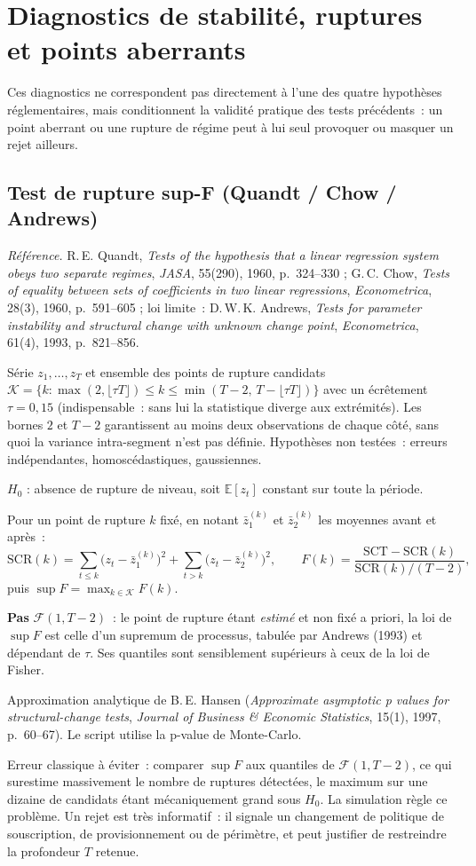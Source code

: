 \documentclass[a4paper,11pt]{article}
\newcommand{\refl}[1]{{\small\textcolor{maincolor!70!black}{\textit{Référence.} #1}}\par\smallskip}
\newcounter{ficheid}
\newenvironment{fiche}[1]{%
  \stepcounter{ficheid}%
  \phantomsection
  \subsection{#1}%
  \label{fiche:\theficheid}%
}{%
  \end{description}\vspace{0.5em}%
}
\newcommand{\Cadre}{%
  \begin{description}[leftmargin=0pt, style=unboxed, itemsep=3pt, topsep=3pt, parsep=2pt]%
  \item[\textcolor{financeblue}{\textbf{1. Cadre, notations et hypothèses de validité (non testées).}}]}
\newcommand{\Hzero}{\item[\textcolor{financeblue}{\textbf{2. Hypothèse nulle.}}]}
\newcommand{\Stat}{\item[\textcolor{financeblue}{\textbf{3. Statistique de test.}}]}
\newcommand{\Loi}{\item[\textcolor{financeblue}{\textbf{4. Loi sous $H_0$.}}]}
\newcommand{\Pval}{\item[\textcolor{financeblue}{\textbf{5. p-value.}}]}
\newcommand{\Usage}{\item[\textcolor{financeblue}{\textbf{6. Usage et limites.}}]}
\begin{document}
\newpage
\clearpage
\section{Diagnostics de stabilité, ruptures et points aberrants}

Ces diagnostics ne correspondent pas directement à l'une des quatre hypothèses réglementaires,
mais conditionnent la validité pratique des tests précédents~: un point aberrant ou une rupture de
régime peut à lui seul provoquer ou masquer un rejet ailleurs.

\begin{fiche}{Test de rupture sup-F (Quandt / Chow / Andrews)}
\refl{R.\,E. Quandt, \emph{Tests of the hypothesis that a linear regression system obeys two
separate regimes}, \emph{JASA}, 55(290), 1960, p.~324--330 ; G.\,C. Chow, \emph{Tests of equality
between sets of coefficients in two linear regressions}, \emph{Econometrica}, 28(3), 1960,
p.~591--605 ; loi limite~: D.\,W.\,K. Andrews, \emph{Tests for parameter instability and
structural change with unknown change point}, \emph{Econometrica}, 61(4), 1993, p.~821--856.}
\Cadre
Série $z_1,\dots,z_T$ et ensemble des points de rupture candidats
$\mathcal{K} = \{k : \max(2, \lfloor \tau T\rfloor) \le k \le \min(T-2,\, T - \lfloor \tau T\rfloor)\}$
avec un écrêtement $\tau = 0{,}15$ (indispensable~: sans lui la statistique diverge aux
extrémités). Les bornes $2$ et $T-2$ garantissent au moins deux observations de chaque côté,
sans quoi la variance intra-segment n'est pas définie.
Hypothèses non testées~: erreurs indépendantes, homoscédastiques, gaussiennes.
\Hzero
$H_0$ : absence de rupture de niveau, soit $\mathbb{E}[z_t]$ constant sur toute la période.
\Stat
Pour un point de rupture $k$ fixé, en notant $\bar z_1^{(k)}$ et $\bar z_2^{(k)}$ les moyennes
avant et après~:
\[
  \mathrm{SCR}(k) = \sum_{t\le k}\big(z_t - \bar z_1^{(k)}\big)^2 + \sum_{t> k}\big(z_t - \bar z_2^{(k)}\big)^2,
  \qquad
  F(k) = \frac{\mathrm{SCT} - \mathrm{SCR}(k)}{\mathrm{SCR}(k)/(T-2)},
\]
puis $\displaystyle \sup F = \max_{k\in\mathcal{K}} F(k)$.
\Loi
\textbf{Pas} $\mathcal{F}(1,T-2)$~: le point de rupture étant \emph{estimé} et non fixé a priori,
la loi de $\sup F$ est celle d'un supremum de processus, tabulée par Andrews (1993) et dépendant
de $\tau$. Ses quantiles sont sensiblement supérieurs à ceux de la loi de Fisher.
\Pval
Approximation analytique de B.\,E. Hansen (\emph{Approximate asymptotic p values for
structural-change tests}, \emph{Journal of Business \& Economic Statistics}, 15(1), 1997,
p.~60--67). Le script utilise la p-value de Monte-Carlo.
\Usage
Erreur classique à éviter~: comparer $\sup F$ aux quantiles de $\mathcal{F}(1,T-2)$, ce qui
surestime massivement le nombre de ruptures détectées, le maximum sur une dizaine de candidats
étant mécaniquement grand sous $H_0$. La simulation règle ce problème. Un rejet est très
informatif~: il signale un changement de politique de souscription, de provisionnement ou de
périmètre, et peut justifier de restreindre la profondeur $T$ retenue.
\end{fiche}
\end{document}
